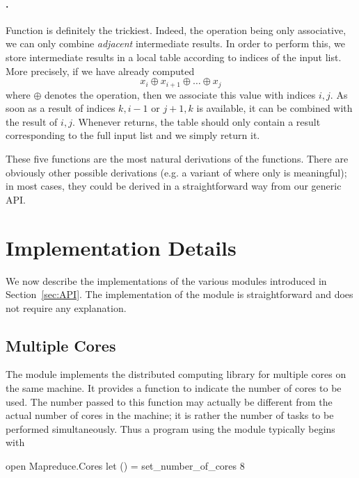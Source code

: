 \documentclass[preprint]{sigplanconf}
\begin{document}
\paragraph{.}
Function  is definitely the trickiest. Indeed, the
operation being only associative, we can only combine \emph{adjacent}
intermediate results. In order to perform this, we store intermediate
results in a local table according to indices of the input list. More
precisely, if we have already computed
\begin{displaymath}
  x_i \oplus x_{i+1} \oplus \dots \oplus x_j
\end{displaymath}
where $\oplus$ denotes the  operation, then we associate this
value with indices $i,j$. As soon as a result of indices $k,i-1$ or
$j+1,k$ is available, it can be combined with the result of $i,j$.
Whenever  returns, the table should only contain a result
corresponding to the full input list and we simply return it.


These five functions are the most natural derivations of the
 functions. There are obviously other possible derivations
(e.g. a variant of  where only  is meaningful);
in most cases, they could be derived in a straightforward way from our
generic API.


\section{Implementation Details}\label{sec:implem}

We now describe the implementations of the various modules introduced
in Section~\ref{sec:API}. The implementation of the 
module is straightforward and does not require any explanation.

\subsection{Multiple Cores}

The  module implements the distributed computing library for
multiple cores on the same machine. It provides a function
 to indicate the number of cores
to be used. The number passed to this function may actually be
different from the actual number of cores in the machine; it is rather
the number of tasks to be performed simultaneously. 
Thus a program using the  module typically begins with 
\begin{ocaml}
open Mapreduce.Cores
let () = set_number_of_cores 8
\end{ocaml}
\end{document}
